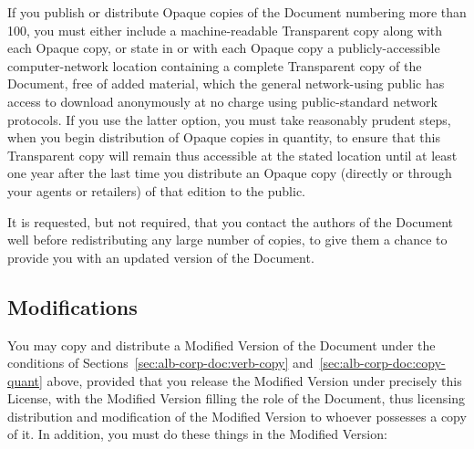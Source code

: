 \documentclass[11pt,letter,oneside]{article}
\begin{document}
\begin{albTitlePage}
If you publish or distribute Opaque copies of the Document numbering
more than 100, you must either include a machine-readable Transparent
copy along with each Opaque copy, or state in or with each Opaque copy a
publicly-accessible computer-network location containing a complete
Transparent copy of the Document, free of added material, which the
general network-using public has access to download anonymously at no
charge using public-standard network protocols.  If you use the latter
option, you must take reasonably prudent steps, when you begin
distribution of Opaque copies in quantity, to ensure that this
Transparent copy will remain thus accessible at the stated location
until at least one year after the last time you distribute an Opaque
copy (directly or through your agents or retailers) of that edition to
the public.

It is requested, but not required, that you contact the authors of the
Document well before redistributing any large number of copies, to give
them a chance to provide you with an updated version of the Document.


\subsection{Modifications}
\label{sec:alb-corp-doc:modif}

You may copy and distribute a Modified Version of the Document under the
conditions of Sections~\ref{sec:alb-corp-doc:verb-copy}
and~\ref{sec:alb-corp-doc:copy-quant} above, provided that you release
the Modified Version under precisely this License, with the Modified
Version filling the role of the Document, thus licensing distribution
and modification of the Modified Version to whoever possesses a copy of
it.  In addition, you must do these things in the Modified Version:


\end{albTitlePage}
\end{document}
